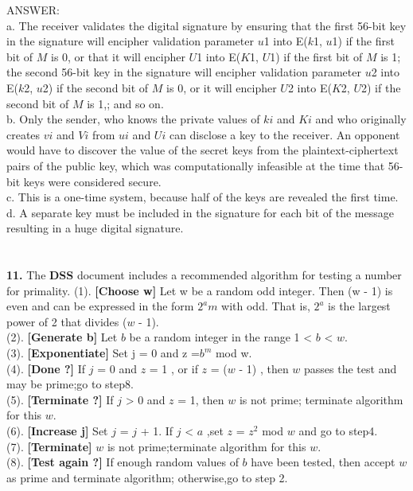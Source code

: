\documentclass[paper=a4, fontsize=11pt]{scrartcl} %
\numberwithin{equation}{section} %
\numberwithin{figure}{section} %
\numberwithin{table}{section} %
\begin{document}
ANSWER: \\
a.  The receiver validates the digital signature by ensuring that the first 56-bit key in the signature will encipher validation parameter $u$1 into E($k$1, $u$1) if the first bit of $M$ is 0, or that it will encipher $U$1 into E($K$1, $U$1) if the first bit of $M$ is 1; the second 56-bit key in the signature will encipher validation parameter $u$2 into E($k$2, $u$2) if the second bit of $M$ is 0, or it will encipher $U$2 into E($K$2, $U$2) if the second bit of $M$ is 1,; and so on.\\
b.  Only the sender, who knows the private values of $ki$ and $Ki$ and who originally creates $vi$ and $Vi$ from $ui$ and $Ui$ can disclose a key to the receiver. An opponent would have to discover the value of the secret keys from the plaintext-ciphertext pairs of the public key, which was computationally infeasible at the time that 56-bit keys were considered secure.\\
c.  This is a one-time system, because half of the keys are revealed the first time.\\
d.  A separate key must be included in the signature for each bit of the message resulting in a huge digital signature.\\
\\
\\
\textbf{11.} The \textbf{DSS} document includes a recommended algorithm for testing a number for primality.
  (1).  \textbf{[Choose w]} Let w be a random odd integer. Then (w - 1) is even and can be expressed in the form $2^{a}m$ with odd. That is, $2^{a}$ is the largest power of 2 that divides ($w$ - 1).\\
  (2).  \textbf{[Generate b]} Let $b$ be a random integer in the range 1 < $b$ < $w$.\\
  (3).  \textbf{[Exponentiate]} Set j = 0 and z =$b^{m}$ mod w.\\
  (4).  \textbf{[Done ?]} If $j$ = 0 and $z$ = 1 , or if $z$ = ($w$ - 1) , then $w$ passes the test and may be prime;go to step8.\\
  (5).  \textbf{[Terminate ?]} If $j$ > 0 and $z$ = 1, then $w$ is not prime; terminate algorithm for this $w$.\\
  (6).  \textbf{[Increase j]} Set $j$ = $j$ + 1. If $j$ < $a$ ,set $z$ = $z^{2}$ mod $w$ and go to step4.\\
  (7).  \textbf{[Terminate]} $w$ is not prime;terminate algorithm for this $w$.\\
  (8).  \textbf{[Test again ?]} If enough random values of $b$ have been tested, then accept $w$ as prime and terminate algorithm; otherwise,go to step 2.\\
\end{document}
